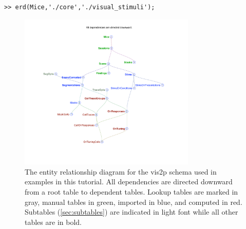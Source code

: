 \documentclass[10pt]{article}
\begin{document}
\begin{lstlisting}
>> erd(Mice,'./core','./visual_stimuli');
\end{lstlisting}
\begin{figure}[h]
\center \includegraphics[width=0.75\textwidth]{erd.pdf}
\caption{The entity relationship diagram for the vis2p schema used in examples in this tutorial.  All dependencies are directed downward from a root table to dependent tables. Lookup tables are marked in gray, manual tables in green, imported in blue, and computed in red. Subtables (\autoref{sec:subtables}) are indicated in light font while all other tables are in bold.}
\label{fig:erd}
\end{figure}
\end{document}
